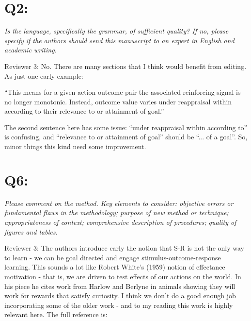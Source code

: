 \documentclass[utf8]{article}
\newenvironment{reply}  
    {\color{Blue}\noindent\newline}
    {\newline}
\begin{document}
    \section*{Q2:}
        \textit{Is the language, specifically the grammar, of sufficient quality? If no, please specify if the authors should send this manuscript to an expert in English and academic writing.} \newline

    Reviewer 3:
    No. There are many sections that I think would benefit from editing. As just one early example:
    
    ``This means for a given action-outcome pair the associated reinforcing signal is no longer monotonic. Instead, outcome value varies under reappraisal within according to their relevance to or attainment of goal.''
    
    The second sentence here has some issue: ``under reappraisal within according to'' is confusing, and ``relevance to or attainment of goal'' should be ``... of a goal''. So, minor things this kind need some improvement.
    
    \begin{reply}
    \end{reply}
    

    \section*{Q6:}
        \textit{Please comment on the method. Key elements to consider: objective errors or fundamental flaws in the methodology; purpose of new method or technique; appropriateness of context; comprehensive description of procedures; quality of figures and tables.}\newline
        
        Reviewer 3:
        The authors introduce early the notion that S-R is not the only way to learn - we can be goal directed and engage stimulus-outcome-response learning. This sounds a lot like Robert White's (1959) notion of effectance motivation - that is, we are driven to test effects of our actions on the world. In his piece he cites work from Harlow and Berlyne in animals showing they will work for rewards that satisfy curiosity. I think we don't do a good enough job incorporating some of the older work - and to my reading this work is highly relevant here. The full reference is:
        
\end{document}
